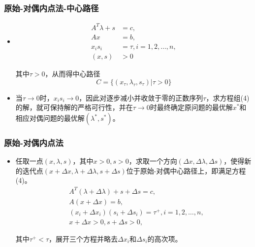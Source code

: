 \documentclass[notheorems,mathserif,table,compress]{beamer}  %
\begin{document}
%
\begin{frame}
\frametitle{原始-对偶内点法-中心路径}
\begin{itemize}
\item 
\begin{equation}
\begin{split}
A^{T}\lambda+s&=c,\\
Ax&=b,\\
x_is_i&=\tau, i=1,2,\dots,n,\\
(x,s)&>0
\end{split}
\end{equation}

其中$\tau>0$，从而得中心路径
\begin{displaymath}
C=\{(x_{\tau},\lambda_{\tau},s_{\tau})|\tau>0\}
\end{displaymath}

\item 当$\tau\to 0$时，$x_is_i\to 0$，因此对逐步减小并收敛于零的正数序列$\tau$，求方程组(4)的解，就可保持解的严格可行性，并在$\tau\to 0$时最终确定原问题的最优解$x^*$和相应对偶问题的最优解$(\lambda^*,s^*)$。
\end{itemize}
\end{frame}


%
\begin{frame}
\frametitle{原始-对偶内点法} 
\begin{itemize}
\item 任取一点$(x,\lambda,s)$，其中$x>0,s>0$，求取一个方向$(\Delta x,\Delta \lambda,\Delta s)$，使得新的迭代点$(x+ \Delta x,\lambda+\Delta \lambda,s+\Delta s)$位于原始-对偶中心路径上，即满足方程(4)。
\begin{equation}
\begin{split}
&A^{T}(\lambda+\Delta\lambda)+s+\Delta s=c,\\
&A(x+\Delta x)=b,\\
&(x_i+\Delta x_i)(s_i+\Delta s_i)=\tau^+, i=1,2,\dots,n,\\
&x+\Delta x>0, s+\Delta s>0,
\end{split}
\end{equation}

其中$\tau^+<\tau$，展开三个方程并略去$\Delta x_i$和$\Delta s_i$的高次项。
\end{itemize}
\end{frame}
\end{document}
